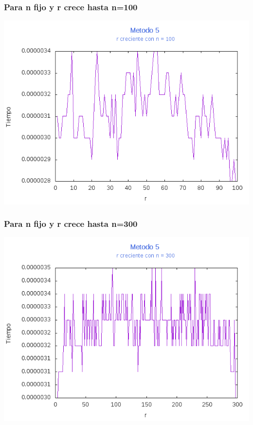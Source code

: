 \documentclass[12pt,letterpaper]{scrartcl}
\begin{document}
\subsubsection{Para n fijo y r crece hasta n=100}
\includegraphics[scale=1]{Metodo5/plot100m5}

\subsubsection{Para n fijo y r crece hasta n=300}
\includegraphics[scale=1]{Metodo5/plot300m5}
\end{document}
